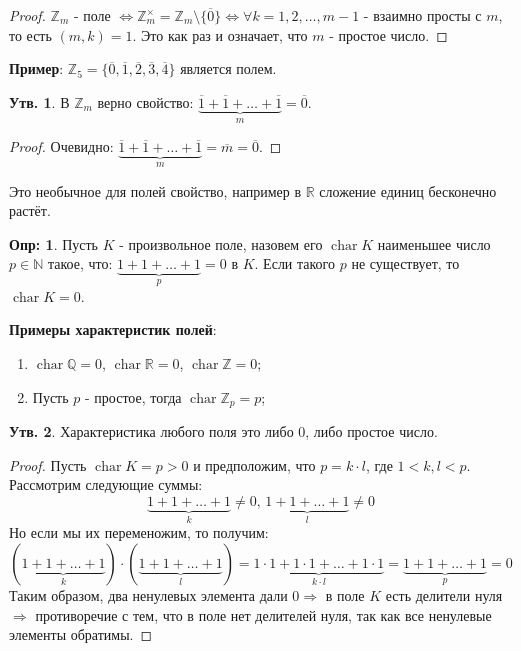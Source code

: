 \documentclass[12pt]{article}
\newcommand{\MR}{\mathbb{R}}
\newcommand{\MQ}{\mathbb{Q}}
\newcommand{\MN}{\mathbb{N}}
\newcommand{\MZ}{\mathbb{Z}}
\theoremstyle{definition}
\newtheorem{defn}{Опр:}
\newtheorem{prop}{Утв.}
\newcommand{\ovl}[1]{\overline{#1}}
\DeclareMathOperator{\Char}{\operatorname{char}}
\begin{document}
\begin{proof}
	$\MZ_m$ - поле $\Leftrightarrow \MZ_m^{\times} = \MZ_m \setminus \{\ovl{0}\} \Leftrightarrow \forall k = 1,2, \dotsc, m-1 $ - взаимно просты с $m$, то есть $(m,k) = 1$. Это как раз и означает, что $m$ - простое число.
\end{proof}

\textbf{Пример}: $\MZ_5 = \{\ovl{0},\ovl{1},\ovl{2},\ovl{3},\ovl{4}\}$ является полем.

\begin{prop}
	В $\MZ_m$ верно свойство: $\underbrace{\ovl{1} + \ovl{1} + \dotsc + \ovl{1}}_{m} = \ovl{0}$. 
\end{prop}
\begin{proof}
	Очевидно: $\underbrace{\ovl{1} + \ovl{1} + \dotsc + \ovl{1}}_{m} = \ovl{m} = \ovl{0}$.
\end{proof}
Это необычное для полей свойство, например в $\MR$ сложение единиц бесконечно растёт.

\begin{defn}
	Пусть $K$ - произвольное поле, назовем его  $\Char{K}$ наименьшее число $p \in \MN$ такое, что: $\underbrace{1 + 1 + \dotsc + 1}_{p} = 0$ в $K$. Если такого $p$ не существует, то $\Char{K} = 0$.
\end{defn}

\textbf{Примеры характеристик полей}:
\begin{enumerate}[label=\arabic*)]
	\item $\Char{\MQ} = 0$, $\Char{\MR} = 0$, $\Char{\MZ} = 0$; 
	\item Пусть $p$ - простое, тогда $\Char{\MZ_p} = p$;
\end{enumerate}

\begin{prop}
	Характеристика любого поля это либо $0$, либо простое число.
\end{prop}
\begin{proof}
	Пусть $\Char{K} = p > 0$ и предположим, что $p = k{\cdot}l$, где $1 < k,l < p$. Рассмотрим следующие суммы:
	$$
		\underbrace{1 + 1 + \dotsc + 1}_{k} \neq 0, \,  \underbrace{1 + 1 + \dotsc + 1}_{l} \neq 0
	$$
	Но если мы их переменожим, то получим:
	$$
		(\underbrace{1 + 1 + \dotsc + 1}_{k}){\cdot}(\underbrace{1 + 1 + \dotsc + 1}_{l}) = \underbrace{1{\cdot}1 + 1{\cdot}1 + \dotsc + 1{\cdot}1}_{k{\cdot}l} = \underbrace{1 + 1 + \dotsc + 1}_{p} = 0
	$$
	Таким образом, два ненулевых элемента дали $0 \Rightarrow$ в поле $K$ есть делители нуля $\Rightarrow$ противоречие с тем, что в поле нет делителей нуля, так как все ненулевые элементы обратимы.
\end{proof}
\end{document}
